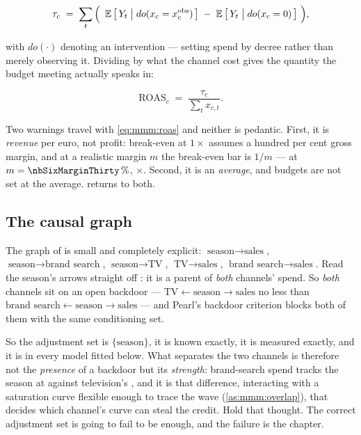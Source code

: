 \begin{equation}
  \tau_c \;=\; \sum_{t}
    \Big(\ \operatorname{\mathbb{E}}\big[\, Y_t \;\big|\; do(x_{c} = x_{c}^{\text{obs}})\,\big]
      \;-\; \operatorname{\mathbb{E}}\big[\, Y_t \;\big|\; do(x_{c} = 0)\,\big]\ \Big),
  \label{eq:mmm:estimand}
\end{equation}

with $do(\cdot)$ denoting an intervention --- setting spend by decree rather than merely observing
it. Dividing by what the channel cost gives the quantity the budget meeting actually speaks in:

\begin{equation}
  \text{ROAS}_c \;=\; \frac{\tau_c}{\sum_t x_{c,t}} .
  \label{eq:mmm:roas}
\end{equation}

Two warnings travel with \cref{eq:mmm:roas} and neither is pedantic. First, it is \emph{revenue}
per euro, not profit: break-even at $1\times$ assumes a hundred per cent gross margin, and at a
realistic margin $m$ the break-even bar is $1/m$ --- at $m = \pc{\nbSixMarginThirty}$,
\nbSixBreakevenThirty$\times$. Second, it is an \emph{average}, and budgets are not set at the
average.  returns to both.

\subsection*{The causal graph}

The graph of  is small and completely explicit:
$\text{season} \to \text{sales}$, $\text{season} \to \text{brand search}$,
$\text{season} \to \text{TV}$, $\text{TV} \to \text{sales}$,
$\text{brand search} \to \text{sales}$. Read the season's arrows straight off
: it is a parent of \emph{both} channels' spend. So \emph{both}
channels sit on an open backdoor --- $\text{TV} \leftarrow \text{season} \to \text{sales}$ no less
than $\text{brand search} \leftarrow \text{season} \to \text{sales}$ --- and Pearl's backdoor
criterion \citep{pearl1995, pearl2009} blocks both of them with the same conditioning set.

So the adjustment set is $\{\text{season}\}$, it is known exactly, it is measured exactly, and it
is in every model fitted below. What separates the two channels is therefore not the
\emph{presence} of a backdoor but its \emph{strength}: brand-search spend tracks the season at
\nbSixCorrBsSeason{} against television's \nbSixCorrTvSeason{}, and it is that difference,
interacting with a saturation curve flexible enough to trace the wave (\cref{as:mmm:overlap}), that
decides which channel's curve can steal the credit. Hold that thought. The correct adjustment set
is going to fail to be enough, and the failure is the chapter.

